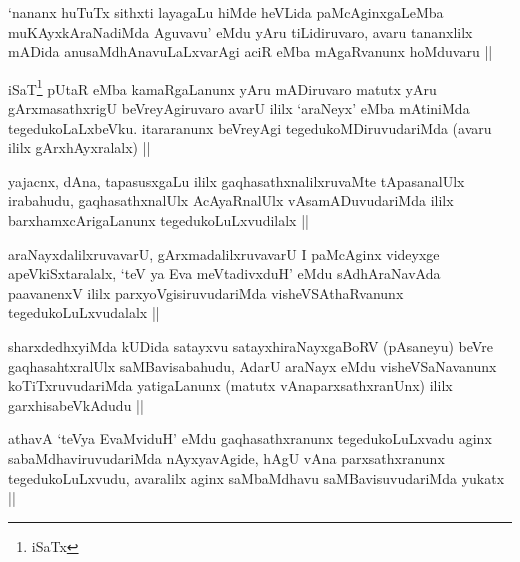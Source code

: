 \begin{artha}
`nananx huTuTx sithxti layagaLu hiMde heVLida paMcAginxgaLeMba
muKAyxkAraNadiMda Aguvavu' eMdu yAru tiLidiruvaro, avaru tananxlilx
mADida anusaMdhAnavuLaLxvarAgi aciR eMba mAgaRvanunx hoMduvaru ||
\end{artha}


\begin{artha}
iSaT\footnote{iSaTx} pUtaR eMba kamaRgaLanunx yAru mADiruvaro
matutx yAru gArxmasathxrigU beVreyAgiruvaro avarU ililx `araNeyx' eMba
mAtiniMda tegedukoLaLxbeVku. itararanunx beVreyAgi
tegedukoMDiruvudariMda (avaru ililx gArxhAyxralalx) ||
\end{artha}


\begin{artha}
yajacnx, dAna, tapasusxgaLu ililx gaqhasathxnalilxruvaMte tApasanalUlx
irabahudu, gaqhasathxnalUlx AcAyaRnalUlx vAsamADuvudariMda ililx
barxhamxcArigaLanunx tegedukoLuLxvudilalx ||
\end{artha}

\begin{artha}
araNayxdalilxruvavarU, gArxmadalilxruvavarU I paMcAginx videyxge
apeVkiSxtaralalx, `teV ya Eva meVtadivxduH' eMdu sAdhAraNavAda
paavanenxV ililx parxyoVgisiruvudariMda visheVSAthaRvanunx
tegedukoLuLxvudalalx ||
\end{artha}


\begin{artha}
sharxdedhxyiMda kUDida satayxvu satayxhiraNayxgaBoRV (pAsaneyu) beVre
gaqhasahtxralUlx saMBavisabahudu, AdarU araNayx eMdu visheVSaNavanunx
koTiTxruvudariMda yatigaLanunx (matutx vAnaparxsathxranUnx) ililx
garxhisabeVkAdudu ||
\end{artha}


\begin{artha}
athavA `teVya EvaMviduH' eMdu gaqhasathxranunx tegedukoLuLxvadu aginx
sabaMdhaviruvudariMda nAyxyavAgide, hAgU vAna parxsathxranunx
tegedukoLuLxvudu, avaralilx aginx saMbaMdhavu saMBavisuvudariMda
yukatx ||
\end{artha}

